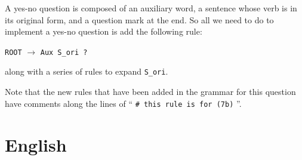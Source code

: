 \documentclass[11pt]{article}
\newcommand{\code}[1]{\texttt{#1}}
\begin{document}
\begin{enumerate}
	A yes-no question is composed of an auxiliary word, a sentence whose verb is in its original form, and a question mark at the end. So all we need to do to implement a yes-no question is add the following rule:
\begin{center}
	\code{ROOT} $\to$ \code{Aux S\_ori ?}
\end{center}
along with a series of rules to expand \code{S\_ori}.

Note that the new rules that have been added in the grammar for this question have comments along the lines of `` \code{\# this rule is for (7b)} ''.
\end{enumerate}
\section{English}
\end{document}
